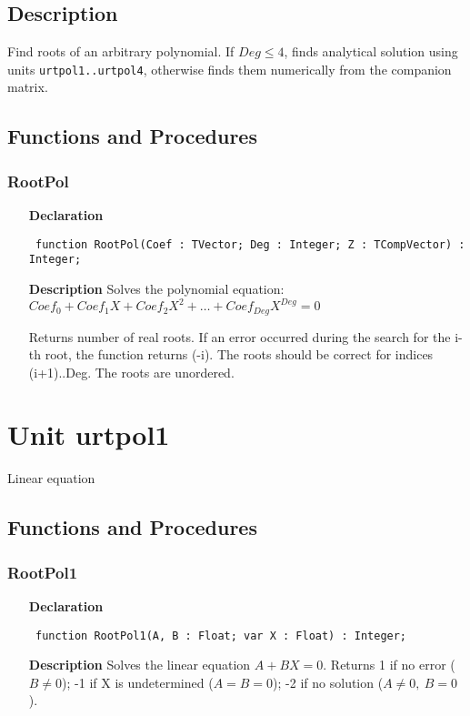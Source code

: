 \documentclass[12pt,a4paper,oneside]{report}
\newcommand{\declarationitem}[1]{\textbf{#1}}
\newcommand{\descriptiontitle}[1]{\textbf{#1}}
\newcommand{\code}[1]{\texttt{#1}}
\begin{document}
\subsection{Description}
Find roots of an arbitrary polynomial. If $Deg \le 4$, finds analytical solution using units \code{urtpol1..urtpol4}, otherwise finds them numerically from the companion matrix.
\subsection{Functions and Procedures}
\subsubsection{RootPol}
\label{urootpol-RootPol}
\begin{itemize}\item[\declarationitem{Declaration}\hfill]
	\begin{flushleft}
		\code{
			function RootPol(Coef : TVector; Deg : Integer; Z : TCompVector) : Integer;}
		
	\end{flushleft}
	
	\par
	\item[\descriptiontitle{Description}]
	Solves the polynomial equation:\\ 
	$Coef_0 + Coef_1 X + Coef_2 X^2 + \dots + Coef_{Deg} X^{Deg} = 0$
	
	Returns number of real roots. If an error occurred during the search for the i-th root, the function returns
	(-i). The roots should be correct for indices (i+1)..Deg. The roots are unordered.
\end{itemize}

\section{Unit urtpol1}
\label{urtpol1}
Linear equation 
\subsection{Functions and Procedures}
\subsubsection{RootPol1}
\label{urtpol1-RootPol1}
\begin{itemize}\item[\declarationitem{Declaration}\hfill]
	\begin{flushleft}
		\code{
			function RootPol1(A, B : Float; var X : Float) : Integer;}
		
	\end{flushleft}
	
	\par
	\item[\descriptiontitle{Description}]
	Solves the linear equation $A + B X = 0$. Returns 1 if no error ($B \ne 0$); -1 if X is undetermined ($A = B = 0$); -2 if no solution ($A \ne 0,\ B = 0$).
\end{itemize}
\end{document}
